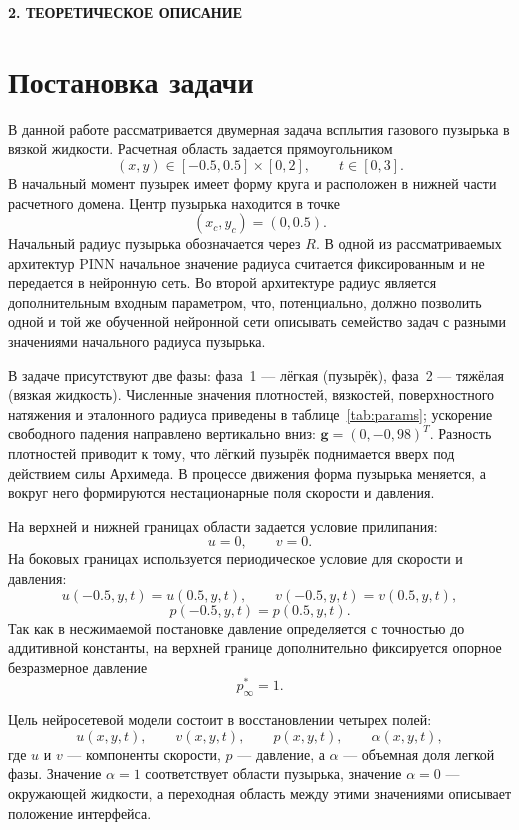 \newpage
\begin{center}
  \textbf{\large 2. ТЕОРЕТИЧЕСКОЕ ОПИСАНИЕ}
\end{center}

\section{Постановка задачи}

В данной работе рассматривается двумерная задача всплытия газового пузырька в
вязкой жидкости. Расчетная область задается прямоугольником
\[
    (x,y)\in[-0.5,0.5]\times[0,2],
    \qquad
    t\in[0,3].
\]
В начальный момент пузырек имеет форму круга и расположен в нижней части
расчетного домена. Центр пузырька находится в точке
\[
    (x_c,y_c)=(0,0.5).
\]
Начальный радиус пузырька обозначается через \(R\). В одной из рассматриваемых архитектур PINN
начальное значение радиуса считается фиксированным и не передается в нейронную
сеть. Во второй архитектуре радиус является дополнительным входным параметром,
что, потенциально, должно позволить одной и той же обученной нейронной сети описывать семейство задач с разными значениями начального радиуса пузырька.

В задаче присутствуют две фазы: фаза~1 --- лёгкая (пузырёк), фаза~2 --- тяжёлая
(вязкая жидкость). Численные значения плотностей, вязкостей, поверхностного
натяжения и эталонного радиуса приведены в таблице~\ref{tab:params};
ускорение свободного падения направлено вертикально вниз:
$\mathbf{g}=(0,{-}0{,}98)^T$.
Разность плотностей приводит к тому, что лёгкий пузырёк поднимается вверх под
действием силы Архимеда. В процессе движения форма пузырька меняется, а вокруг
него формируются нестационарные поля скорости и давления.

На верхней и нижней границах области задается условие прилипания:
\[
    u=0,\qquad v=0.
\]
На боковых границах используется периодическое условие для скорости и давления:
\[
    u(-0.5,y,t)=u(0.5,y,t),
    \qquad
    v(-0.5,y,t)=v(0.5,y,t),
\]
\[
    p(-0.5,y,t)=p(0.5,y,t).
\]
Так как в несжимаемой постановке давление определяется с точностью до
аддитивной константы, на верхней границе дополнительно фиксируется опорное
безразмерное давление
\[
    p_\infty^*=1.
\]

Цель нейросетевой модели состоит в восстановлении четырех полей:
\[
    u(x,y,t),\qquad v(x,y,t),\qquad p(x,y,t),\qquad \alpha(x,y,t),
\]
где \(u\) и \(v\) --- компоненты скорости, \(p\) --- давление, а \(\alpha\) ---
объемная доля легкой фазы. Значение \(\alpha=1\) соответствует области
пузырька, значение \(\alpha=0\) --- окружающей жидкости, а переходная область
между этими значениями описывает положение интерфейса.

